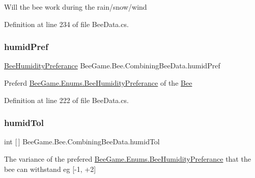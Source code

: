 Will the bee work during the rain/snow/wind 



Definition at line 234 of file Bee\+Data.\+cs.

\mbox{\label{struct_bee_game_1_1_bee_1_1_combining_bee_data_ab9a9a9623d942632f8007711b65f909e}} 
\subsubsection{\texorpdfstring{humid\+Pref}{humidPref}}
{\footnotesize\ttfamily \hyperlink{namespace_bee_game_1_1_enums_a66566cbc9da8d1d1e402156b4bd3bf9d}{Bee\+Humidity\+Preferance} Bee\+Game.\+Bee.\+Combining\+Bee\+Data.\+humid\+Pref}



Preferd \hyperlink{namespace_bee_game_1_1_enums_a66566cbc9da8d1d1e402156b4bd3bf9d}{Bee\+Game.\+Enums.\+Bee\+Humidity\+Preferance} of the \hyperlink{namespace_bee_game_1_1_bee}{Bee} 



Definition at line 222 of file Bee\+Data.\+cs.

\mbox{\label{struct_bee_game_1_1_bee_1_1_combining_bee_data_a98c56c89bcd5f983b4d022c113f789e3}} 
\subsubsection{\texorpdfstring{humid\+Tol}{humidTol}}
{\footnotesize\ttfamily int \mbox{[}$\,$\mbox{]} Bee\+Game.\+Bee.\+Combining\+Bee\+Data.\+humid\+Tol}



The variance of the prefered \hyperlink{namespace_bee_game_1_1_enums_a66566cbc9da8d1d1e402156b4bd3bf9d}{Bee\+Game.\+Enums.\+Bee\+Humidity\+Preferance} that the bee can withstand eg \mbox{[}-\/1, +2\mbox{]} 



